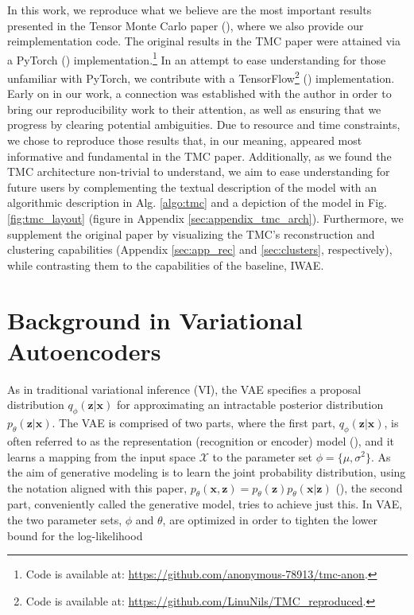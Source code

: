 \documentclass{article}
\begin{document}
In this work, we reproduce what we believe are the most important results presented in the Tensor Monte Carlo paper (\cite{tmc}), where we also provide our reimplementation code. The original results in the TMC paper were attained via a PyTorch (\cite{pytorch}) implementation.\footnote{Code is available at:   \url{https://github.com/anonymous-78913/tmc-anon}.} In an attempt to ease understanding for those unfamiliar with PyTorch, we contribute with a TensorFlow\footnote{Code is available at:
\url{https://github.com/LinuNils/TMC_reproduced}.} (\cite{tensorflow}) implementation. Early on in our work, a connection was established with the author in order to bring our reproducibility work to their attention, as well as ensuring that we progress by clearing potential ambiguities. Due to resource and time constraints, we chose to reproduce those results that, in our meaning, appeared most informative and fundamental in the TMC paper. Additionally, as we found the TMC architecture non-trivial to understand, we aim to ease understanding for future users by complementing the textual description of the model with an algorithmic description in Alg. \ref{algo:tmc} and a depiction of the model in Fig. \ref{fig:tmc_layout} (figure in Appendix \ref{sec:appendix_tmc_arch}). Furthermore, we supplement the original paper by visualizing the TMC's reconstruction and clustering capabilities (Appendix \ref{sec:app_rec} and \ref{sec:clusters}, respectively), while contrasting them to the capabilities of the baseline, IWAE.

\section{Background in Variational Autoencoders}
As in traditional variational inference (VI), the VAE specifies a proposal distribution $q_{\phi}(\bm z|\bm x)$ for approximating an intractable posterior distribution $p_{\theta}(\bm z|\bm x)$. The VAE is comprised of two parts, where the first part, $q_{\phi}(\bm z|\bm x)$, is often referred to as the representation (recognition or encoder) model (\cite{kingma2013autoencoding, tmc, iwae}), and it learns a mapping from the input space $\mathcal{X}$ to the parameter set $\phi = \{\mu, \sigma^2 \}$. As the aim of generative modeling is to learn the joint probability distribution, using the notation aligned with this paper, $p_{\theta}(\bm x, \bm z) = p_{\theta}(\bm z)p_{\theta}(\bm x| \bm z)$ (\cite{kingma2013autoencoding, kingma2018glow, kingma2019introduction}), the second part, conveniently called the generative model, tries to achieve just this. In VAE, the two parameter sets, $\phi$ and $\theta$, are optimized in order to tighten the lower bound for the log-likelihood
\end{document}
